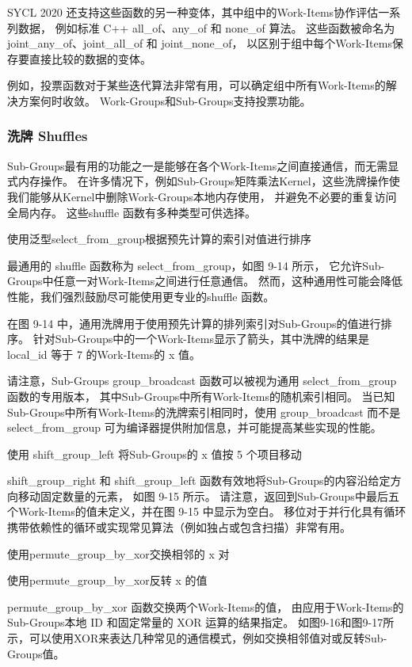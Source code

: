 SYCL 2020 还支持这些函数的另一种变体，其中组中的Work-Items协作评估一系列数据，
例如标准 C++ all\_of、any\_of 和 none\_of 算法。 
这些函数被命名为 joint\_any\_of、joint\_all\_of 和 joint\_none\_of，
以区别于组中每个Work-Items保存要直接比较的数据的变体。

例如，投票函数对于某些迭代算法非常有用，可以确定组中所有Work-Items的解决方案何时收敛。 
Work-Groups和Sub-Groups支持投票功能。

\subsubsection{洗牌 Shuffles}
Sub-Groups最有用的功能之一是能够在各个Work-Items之间直接通信，而无需显式内存操作。 
在许多情况下，例如Sub-Groups矩阵乘法Kernel，这些洗牌操作使我们能够从Kernel中删除Work-Groups本地内存使用，
并避免不必要的重复访问全局内存。 这些shuffle 函数有多种类型可供选择。

{\color{red} 使用泛型select\_from\_group根据预先计算的索引对值进行排序}

最通用的 shuffle 函数称为 select\_from\_group，如图 9-14 所示，
它允许Sub-Groups中任意一对Work-Items之间进行任意通信。 
然而，这种通用性可能会降低性能，我们强烈鼓励尽可能使用更专业的shuffle 函数。

在图 9-14 中，通用洗牌用于使用预先计算的排列索引对Sub-Groups的值进行排序。 
针对Sub-Groups中的一个Work-Items显示了箭头，其中洗牌的结果是 local\_id 等于 7 的Work-Items的 x 值。

请注意，Sub-Groups group\_broadcast 函数可以被视为通用 select\_from\_group 函数的专用版本，
其中Sub-Groups中所有Work-Items的随机索引相同。 
当已知Sub-Groups中所有Work-Items的洗牌索引相同时，使用 group\_broadcast 
而不是 select\_from\_group 可为编译器提供附加信息，并可能提高某些实现的性能。

{\color{red} 使用 shift\_group\_left 将Sub-Groups的 x 值按 5 个项目移动}

shift\_group\_right 和 shift\_group\_left 函数有效地将Sub-Groups的内容沿给定方向移动固定数量的元素，
如图 9-15 所示。 请注意，返回到Sub-Groups中最后五个Work-Items的值未定义，并在图 9-15 中显示为空白。 
移位对于并行化具有循环携带依赖性的循环或实现常见算法（例如独占或包含扫描）非常有用。

{\color{red} 使用permute\_group\_by\_xor交换相邻的 x 对}

{\color{red} 使用permute\_group\_by\_xor反转 x 的值}

permute\_group\_by\_xor 函数交换两个Work-Items的值，
由应用于Work-Items的Sub-Groups本地 ID 和固定常量的 XOR 运算的结果指定。 
如图9-16和图9-17所示，可以使用XOR来表达几种常见的通信模式，例如交换相邻值对或反转Sub-Groups值。

